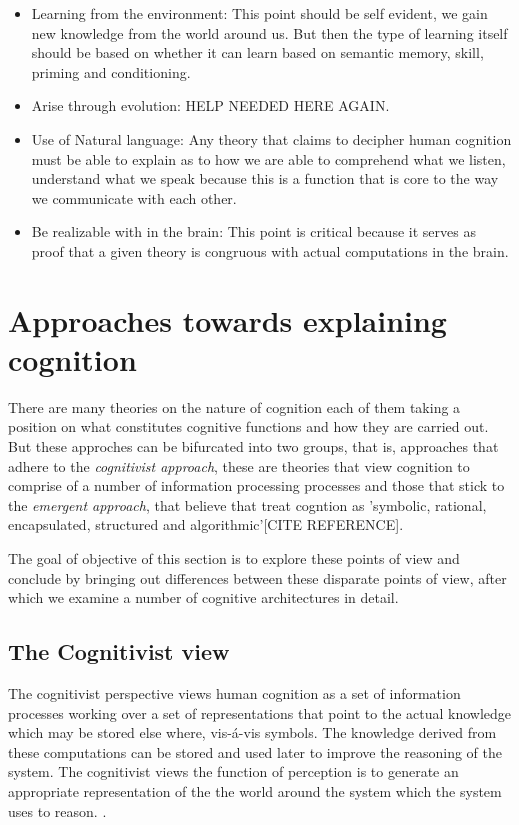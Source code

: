 \begin{itemize}
\item Learning from the environment: This point should be self
evident, we gain new knowledge from the world around us. But then
the type of learning itself should be based on whether it can learn based on
semantic memory, skill, priming and conditioning.

\item Arise through evolution: HELP NEEDED HERE AGAIN.

\item Use of Natural language: Any theory that claims to decipher human
cognition must be able to explain as to how we are able to comprehend
what we listen, understand what we speak because this is a function
that is core to the way we communicate with each other.

\item Be realizable with in the brain: This point is critical because
it serves as proof that a given theory is congruous with actual
computations in the brain.
\end{itemize}
\section{Approaches towards explaining cognition}
    There are many theories on the nature of cognition each of them
    taking a position on what constitutes cognitive functions and how
    they are carried out. But these approches can be bifurcated into
    two groups, that is, approaches that adhere to the
    \emph{cognitivist approach}\cite{DBLP:journals/tec/VernonMS07},
    these are theories that view cognition to comprise of a number of
    information processing processes and those that stick to the
    \emph{emergent approach}, that believe that treat cogntion as
    'symbolic, rational, encapsulated, structured and
    algorithmic'[CITE REFERENCE].

    The goal of objective of this section is to explore these points
    of view and conclude by bringing out differences between these
    disparate points of view, after which we examine a number of
    cognitive architectures in detail.
\subsection{The Cognitivist view}
     The cognitivist perspective views human cognition as a set of
     information processes working over a set of representations that
     point to the actual knowledge which may be stored else where,
     vis-\'{a}-vis symbols. The knowledge derived from these
     computations can be stored and used later to improve the
     reasoning of the system. The cognitivist views the function of
     perception is to generate an appropriate representation of the
     the world around the system which the system uses to
     reason. \cite{DBLP:journals/tec/VernonMS07}. 


